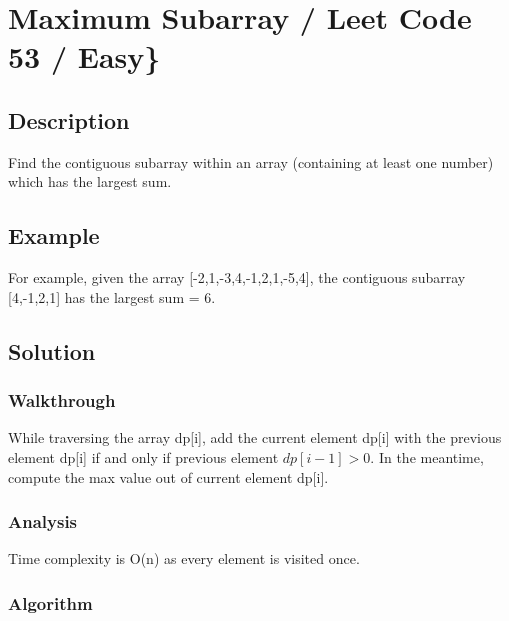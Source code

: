 \documentclass[]{book}
\begin{document}
\hypertarget{maximum-subarray-leet-code-53-easy}{%
\section{Maximum Subarray / Leet Code 53 / Easy\}}\label{maximum-subarray-leet-code-53-easy}}

\hypertarget{description-26}{%
\subsection{Description}\label{description-26}}

Find the contiguous subarray within an array (containing at least one number) which has the largest sum.

\hypertarget{example-25}{%
\subsection{Example}\label{example-25}}

For example, given the array {[}-2,1,-3,4,-1,2,1,-5,4{]}, the contiguous subarray {[}4,-1,2,1{]} has the largest sum = 6.

\hypertarget{solution-20}{%
\subsection{Solution}\label{solution-20}}

\hypertarget{walkthrough-24}{%
\subsubsection{Walkthrough}\label{walkthrough-24}}

While traversing the array dp{[}i{]}, add the current element dp{[}i{]} with the previous element dp{[}i{]} if and only if
previous element \(dp[i-1] > 0\). In the meantime, compute the max value out of current element dp{[}i{]}.

\hypertarget{analysis-27}{%
\subsubsection{Analysis}\label{analysis-27}}

Time complexity is O(n) as every element is visited once.

\hypertarget{algorithm-27}{%
\subsubsection{Algorithm}\label{algorithm-27}}
\end{document}
